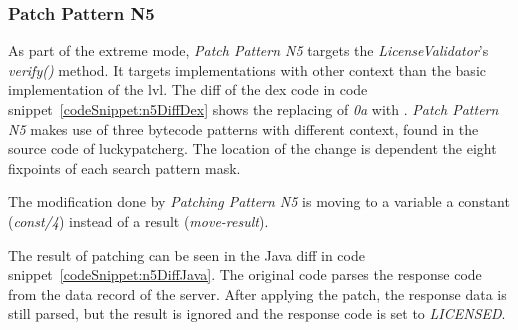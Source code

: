 \subsubsection{Patch Pattern N5}
As part of the extreme mode, \textit{Patch Pattern N5} targets the \textit{LicenseValidator}'s \textit{verify()} method.
It targets implementations with other context than the basic implementation of the \gls{lvl}.
\newline
The diff of the dex code in code snippet~\ref{codeSnippet:n5DiffDex} shows the replacing of \textit{0a} with .
\textit{Patch Pattern N5} makes use of three bytecode patterns with different context, found in the source code of \gls{luckypatcherg}.
The location of the change is dependent the eight fixpoints of each search pattern mask.

The modification done by \textit{Patching Pattern N5} is moving to a variable a constant (\textit{const/4}) instead of a result (\textit{move-result}).

The result of patching can be seen in the Java diff in code snippet~\ref{codeSnippet:n5DiffJava}.
The original code parses the response code from the data record of the server.
After applying the patch, the response data is still parsed, but the result is ignored and the response code is set to \textit{LICENSED}.


